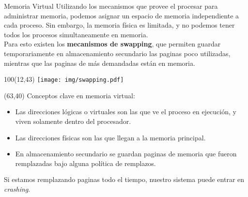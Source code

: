 \documentclass[aspectratio=169]{beamer}
\begin{document}

\begin{frame}[t]{Memoria Virtual}
    \small
    Utilizando los mecanismos que provee el procesar para administrar memoria,
    podemos asignar un espacio de memoria independiente a cada proceso.
    \textcolor{verdeuca}{Sin embargo, la memoria física es limitada, y no podemos tener todos
    los procesos simultaneamente en memoria.}\\
    \medskip
    Para esto existen los \textcolor{naranjauca}{\textbf{mecanismos de swapping}},
    que permiten guardar temporariamente en almacenamiento secundario las paginas poco utilizadas,
    mientras que las paginas de más demandadas están en memoria.
    \begin{textblock}{100}(12,43)
    \texttt{[image: img/swapping.pdf]}
    \end{textblock}
    \begin{textblock}{85}(63,40)
    \small Conceptos clave en memoria virtual:
    \footnotesize
    \begin{itemize}
     \item \textcolor{verdeuca}{Las direcciones lógicas o virtuales son las que ve el proceso en ejecución, y viven solamente dentro del procesador.}
     \item \textcolor{verdeuca}{Las direcciones físicas son las que llegan a la memoria principal.}
     \item \textcolor{verdeuca}{En almacenamiento secundario se guardan paginas de memoria que fueron remplazadas bajo alguna política de remplazos.}
    \end{itemize}
     Si estamos remplazando paginas todo el tiempo, nuestro sistema puede entrar en \emph{crashing}.
    \end{textblock}
\end{frame}
\end{document}
